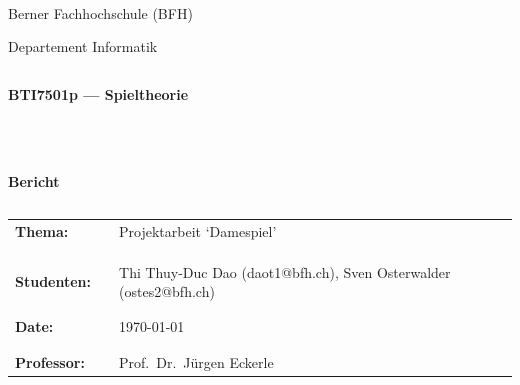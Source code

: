 \thispagestyle{empty}
\begin{center}
\\
\end{center}
\begin{center}
\Large{Berner Fachhochschule (BFH)}\\
\end{center}
 
 
\begin{center}
\Large{Departement Informatik}
\end{center}
\begin{verbatim}
\end{verbatim}
\begin{center}
\textbf{\LARGE{BTI7501p --- Spieltheorie}}
\end{center}
\begin{verbatim}
 
 
\end{verbatim}
\begin{center}
\textbf{Bericht}
\end{center}
\begin{verbatim} 
\end{verbatim}
 
\begin{flushleft}
\begin{tabular}{lll}
\textbf{Thema:} & & Projektarbeit `Damespiel'\\
& & \\
& & \\
& & \\
    \textbf{Studenten:} & & Thi Thuy-Duc Dao (daot1@bfh.ch), Sven Osterwalder (ostes2@bfh.ch)\\
& & \\
& & \\
\textbf{Date:} & & {\today}\\
& & \\
& & \\
\textbf{Professor:} & & Prof.\  Dr.\ Jürgen Eckerle
\end{tabular}
\end{flushleft}
